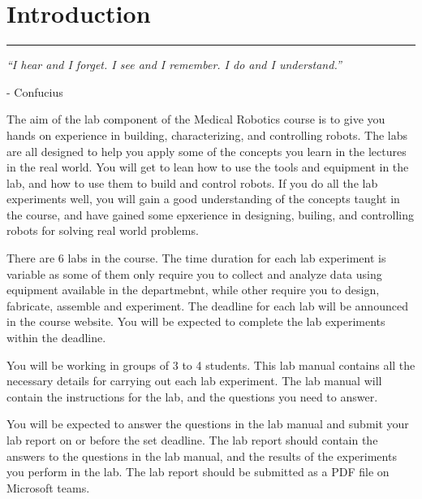 
\section{Introduction}
\hrule
\vspace{0.5cm}

\begin{tcolorbox}[width=\linewidth,frame empty]
    \begin{minipage}{\textwidth}
        \begin{center}
        {\large \textit{``I hear and I forget. I see and I remember. I do and I understand.''}}
        \end{center}

        \raggedleft
        - Confucius
    \end{minipage}
\end{tcolorbox}

The aim of the lab component of the Medical Robotics course is to give you hands on experience in building, characterizing, and controlling robots. The labs are all designed to help you apply some of the concepts you learn in the lectures in the real world. You will get to lean how to use the tools and equipment in the lab, and how to use them to build and control robots. If you do all the lab experiments well, you will gain a good understanding of the concepts taught in the course, and have gained some epxerience in designing, builing, and controlling robots for solving real world problems.

There are 6 labs in the course. The time duration for each lab experiment is variable as some of them only require you to collect and analyze data using equipment available in the departmebnt, while other require you to design, fabricate, assemble and experiment. The deadline for each lab will be announced in the course website. You will be expected to complete the lab experiments within the deadline.

You will be working in groups of 3 to 4 students. This lab manual contains all the necessary details for carrying out each lab experiment. The lab manual will contain the instructions for the lab, and the questions you need to answer. 

You will be expected to answer the questions in the lab manual and submit your lab report on or before the set deadline. The lab report should contain the answers to the questions in the lab manual, and the results of the experiments you perform in the lab. The lab report should be submitted as a PDF file on Microsoft teams.
\newpage

